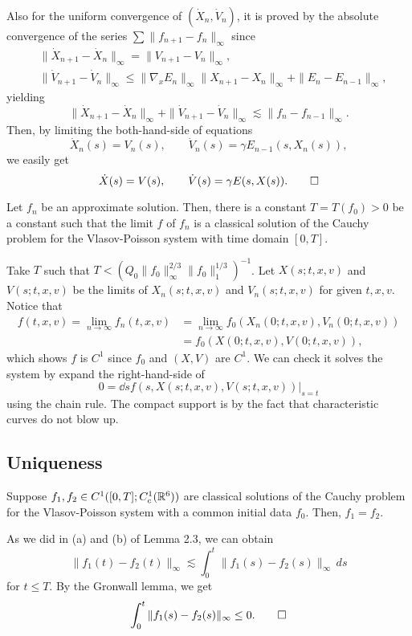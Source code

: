 \documentclass[12pt]{article}
\begin{document}
\begin{pf}
Also for the uniform convergence of $(\dot X_n,\dot V_n)$, it is proved by the absolute convergence of the series $\sum\|f_{n+1}-f_n\|_\infty$ since
\begin{align*}
&\|\dot X_{n+1}-\dot X_n\|_\infty=\|V_{n+1}-V_n\|_\infty,\\
&\|\dot V_{n+1}-\dot V_n\|_\infty\le\|\nabla_xE_n\|_\infty\|X_{n+1}-X_n\|_\infty+\|E_n-E_{n-1}\|_\infty,
\end{align*}
yielding
\[\|\dot X_{n+1}-\dot X_n\|_\infty+\|\dot V_{n+1}-\dot V_n\|_\infty\lesssim\|f_n-f_{n-1}\|_\infty.\]
Then, by limiting the both-hand-side of equations
\[\dot X_n(s)=V_n(s),\qquad \dot V_n(s)=\gamma E_{n-1}(s,X_n(s)),\]
we easily get
\[\dot X(s)=V(s),\qquad \dot V(s)=\gamma E(s,X(s)).\qedhere\]
\end{pf}

\begin{thm}
Let $f_n$ be an approximate solution.
Then, there is a constant $T=T(f_0)>0$ be a constant such that the limit $f$ of $f_n$ is a classical solution of the Cauchy problem for the Vlasov-Poisson system with time domain $[0,T]$.
\end{thm}
\begin{pf}
Take $T$ such that $T<(Q_0\|f_0\|_\infty^{2/3}\|f_0\|_1^{1/3})^{-1}$.
Let $X(s;t,x,v)$ and $V(s;t,x,v)$ be the limits of $X_n(s;t,x,v)$ and $V_n(s;t,x,v)$ for given $t,x,v$.
Notice that
\begin{align*}
f(t,x,v)=\lim_{n\to\infty}f_n(t,x,v)&=\lim_{n\to\infty}f_0(X_n(0;t,x,v),V_n(0;t,x,v))\\
&=f_0(X(0;t,x,v),V(0;t,x,v)),
\end{align*}
which shows $f$ is $C^1$ since $f_0$ and $(X,V)$ are $C^1$.
We can check it solves the system by expand the right-hand-side of
\[0=\dd{s}f(s,X(s;t,x,v),V(s;t,x,v))|_{s=t}\]
using the chain rule.
The compact support is by the fact that characteristic curves do not blow up.
\end{pf}


\subsection{Uniqueness}
\begin{thm}[Uniqueness]
Suppose $f_1,f_2\in C^1([0,T];C_c^1(\mathbb{R}^6))$ are classical solutions of the Cauchy problem for the Vlasov-Poisson system with a common initial data $f_0$.
Then, $f_1=f_2$.
\end{thm}
\begin{pf}
As we did in (a) and (b) of Lemma 2.3, we can obtain
\[\|f_1(t)-f_2(t)\|_\infty\lesssim\int_0^t\|f_1(s)-f_2(s)\|_\infty\,ds\]
for $t\le T$.
By the Gronwall lemma, we get
\[\int_0^t\|f_1(s)-f_2(s)\|_\infty\le0.\qedhere\]
\end{pf}
\end{document}
